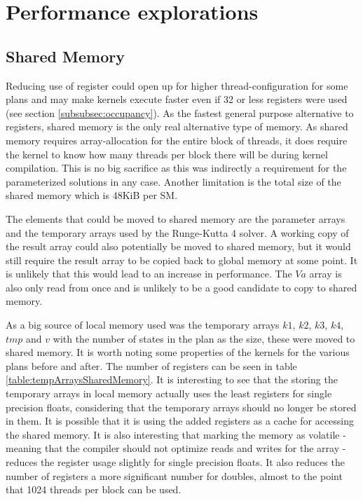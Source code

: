 \section{Performance explorations}
\subsection{Shared Memory}\label{subsec:sharedmem}
Reducing use of register could open up for higher thread-configuration for some plans and may make kernels execute faster even if 32 or less registers were used (see section \ref{subsubsec:occupancy}).
As the fastest general purpose alternative to registers, shared memory is the only real alternative type of memory.
As shared memory requires array-allocation for the entire block of threads, it does require the kernel to know how many threads per block there will be during kernel compilation.
This is no big sacrifice as this was indirectly a requirement for the parameterized solutions in any case.
Another limitation is the total size of the shared memory which is 48KiB per SM.

The elements that could be moved to shared memory are the parameter arrays and the temporary arrays used by the Runge-Kutta 4 solver.
A working copy of the result array could also potentially be moved to shared memory, but it would still require the result array to be copied back to global memory at some point.
It is unlikely that this would lead to an increase in performance.
The $Va$ array is also only read from once and is unlikely to be a good candidate to copy to shared memory.

As a big source of local memory used was the temporary arrays $k1$, $k2$, $k3$, $k4$, $tmp$ and $v$ with the number of states in the plan as the size, these were moved to shared memory.
It is worth noting some properties of the kernels for the various plans before and after.
The number of registers can be seen in table \ref{table:tempArraysSharedMemory}.
It is interesting to see that the storing the temporary arrays in local memory actually uses the least registers for single precision floats, considering that the temporary arrays should no longer be stored in them.
It is possible that it is using the added registers as a cache for accessing the shared memory.
It is also interesting that marking the memory as volatile - meaning that the compiler should not optimize reads and writes for the array - reduces the register usage slightly for single precision floats.
It also reduces the number of registers a more significant number for doubles, almost to the point that 1024 threads per block can be used.

